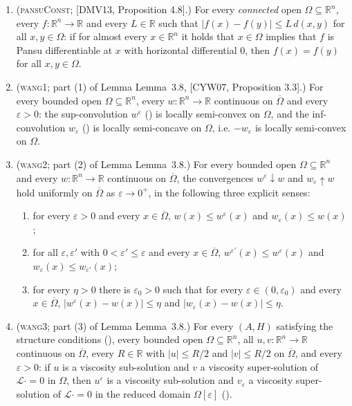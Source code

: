 \begin{definition}
\begin{enumerate}
\item (\textsc{pansuConst}; [DMV13, Proposition 4.8].) For every
  \emph{connected} open $\Omega\subseteq\mathbb R^{n}$, every $f:\mathbb R^{n}\to\mathbb R$
  and every $L\in\mathbb R$ such that $|f(x)-f(y)|\le L\,d(x,y)$ for all $x,y\in\Omega$: if
  for almost every $x\in\mathbb R^{n}$ it holds that $x\in\Omega$ implies that $f$ is Pansu
  differentiable at $x$ with horizontal differential $0$, then $f(x)=f(y)$ for all
  $x,y\in\Omega$.

\item (\textsc{wang1}; part (1) of Lemma Lemma~3.8, [CYW07, Proposition 3.3].) For every
  bounded open $\Omega\subseteq\mathbb R^{n}$, every
  $w:\mathbb R^{n}\to\mathbb R$ continuous on $\overline\Omega$ and every $\varepsilon>0$:
  the sup-convolution $w^{\varepsilon}$ () is locally semi-convex on
  $\Omega$, and the inf-convolution $w_{\varepsilon}$ () is locally
  semi-concave on $\Omega$, i.e. $-w_{\varepsilon}$ is locally semi-convex on $\Omega$.

\item (\textsc{wang2}; part (2) of Lemma Lemma~3.8.) For every bounded
  open $\Omega\subseteq\mathbb R^{n}$ and every $w:\mathbb R^{n}\to\mathbb R$ continuous on
  $\overline\Omega$, the convergences $w^{\varepsilon}\downarrow w$ and
  $w_{\varepsilon}\uparrow w$ hold uniformly on $\overline\Omega$ as
  $\varepsilon\to0^{+}$, in the following three explicit senses:
  \begin{enumerate}
  \item for every $\varepsilon>0$ and every $x\in\overline\Omega$,
    $w(x)\le w^{\varepsilon}(x)$ and $w_{\varepsilon}(x)\le w(x)$;
  \item for all $\varepsilon,\varepsilon'$ with $0<\varepsilon'\le\varepsilon$ and every
    $x\in\overline\Omega$, $w^{\varepsilon'}(x)\le w^{\varepsilon}(x)$ and
    $w_{\varepsilon}(x)\le w_{\varepsilon'}(x)$;
  \item for every $\eta>0$ there is $\varepsilon_0>0$ such that for every
    $\varepsilon\in(0,\varepsilon_0)$ and every $x\in\overline\Omega$,
    $|w^{\varepsilon}(x)-w(x)|\le\eta$ and $|w_{\varepsilon}(x)-w(x)|\le\eta$.
  \end{enumerate}

\item (\textsc{wang3}; part (3) of Lemma Lemma~3.8.) For every $(A,H)$
  satisfying the structure conditions (), every bounded open
  $\Omega\subseteq\mathbb R^{n}$, all $u,v:\mathbb R^{n}\to\mathbb R$ continuous on
  $\overline\Omega$, every $R\in\mathbb R$ with $|u|\le R/2$ and $|v|\le R/2$ on
  $\overline\Omega$, and every $\varepsilon>0$: if $u$ is a viscosity sub-solution and $v$ a
  viscosity super-solution of $\mathcal L\cdot=0$ in $\Omega$, then $u^{\varepsilon}$ is a
  viscosity sub-solution and $v_{\varepsilon}$ a viscosity super-solution of
  $\mathcal L\cdot=0$ in the reduced domain $\Omega[\varepsilon]$ ().
\end{enumerate}


\end{definition}

